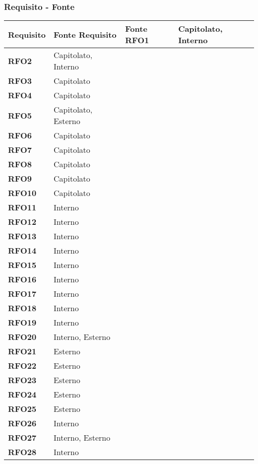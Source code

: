 \subsubsection{Requisito - Fonte}
\begin{longtable}{|>{\centering\arraybackslash}m{}|>{\centering\arraybackslash}m{}|}
	\hline
	\textbf{Requisito} & \textbf{Fonte} 
	\endfirsthead
	\hline
	\textbf{Requisito} & \textbf{Fonte} 
	\endhead
	\hline
	\textbf{RFO1} & Capitolato, Interno \\\hline
	\textbf{RFO2} & Capitolato, Interno \\\hline
	\textbf{RFO3} & Capitolato \\\hline
	\textbf{RFO4} & Capitolato \\\hline
	\textbf{RFO5} & Capitolato, Esterno \\\hline
	\textbf{RFO6} & Capitolato \\\hline
	\textbf{RFO7} & Capitolato \\\hline
	\textbf{RFO8} & Capitolato \\\hline
	\textbf{RFO9} & Capitolato \\\hline
	\textbf{RFO10} & Capitolato \\\hline
	\textbf{RFO11} & Interno \\\hline
	\textbf{RFO12} & Interno \\\hline
	\textbf{RFO13} & Interno \\\hline
	\textbf{RFO14} & Interno \\\hline
	\textbf{RFO15} & Interno \\\hline
	\textbf{RFO16} & Interno \\\hline
	\textbf{RFO17} & Interno \\\hline
	\textbf{RFO18} & Interno \\\hline
	\textbf{RFO19} & Interno \\\hline
	\textbf{RFO20} & Interno, Esterno \\\hline
	\textbf{RFO21} & Esterno \\\hline
	\textbf{RFO22} & Esterno \\\hline
	\textbf{RFO23} & Esterno \\\hline
	\textbf{RFO24} & Esterno \\\hline
	\textbf{RFO25} & Esterno \\\hline
	\textbf{RFO26} & Interno \\\hline
	\textbf{RFO27} & Interno, Esterno \\\hline
	\textbf{RFO28} & Interno \\\hline

\end{longtable}
